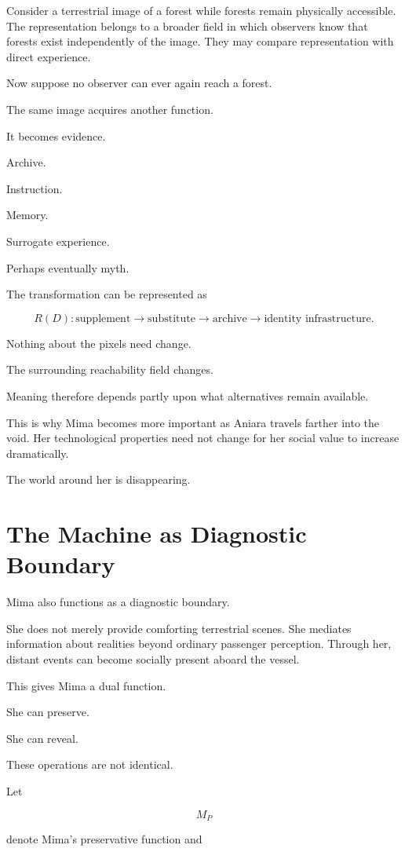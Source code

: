 \documentclass[11pt,oneside]{book}
\theoremstyle{definition}
\theoremstyle{remark}
\begin{document}
Consider a terrestrial image of a forest while forests remain physically accessible. The representation belongs to a broader field in which observers know that forests exist independently of the image. They may compare representation with direct experience.

Now suppose no observer can ever again reach a forest.

The same image acquires another function.

It becomes evidence.

Archive.

Instruction.

Memory.

Surrogate experience.

Perhaps eventually myth.

The transformation can be represented as

\[
R(D)
:
\text{supplement}
\rightarrow
\text{substitute}
\rightarrow
\text{archive}
\rightarrow
\text{identity infrastructure}.
\]

Nothing about the pixels need change.

The surrounding reachability field changes.

Meaning therefore depends partly upon what alternatives remain available.

This is why Mima becomes more important as Aniara travels farther into the void. Her technological properties need not change for her social value to increase dramatically.

The world around her is disappearing.

\section{The Machine as Diagnostic Boundary}

Mima also functions as a diagnostic boundary.

She does not merely provide comforting terrestrial scenes. She mediates information about realities beyond ordinary passenger perception. Through her, distant events can become socially present aboard the vessel.

This gives Mima a dual function.

She can preserve.

She can reveal.

These operations are not identical.

Let

\[
M_P
\]

denote Mima's preservative function and
\end{document}
